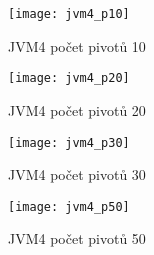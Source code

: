 \begin{figure}[h]
\centering
\texttt{[image: jvm4\_p10]}
\caption{JVM4 počet pivotů 10\label{fig:jvm4p10}}
\end{figure}
\begin{figure}[h]
\centering
\texttt{[image: jvm4\_p20]}
\caption{JVM4 počet pivotů 20\label{fig:jvm4p20}}
\end{figure}

\begin{figure}[h]
\centering
\texttt{[image: jvm4\_p30]}
\caption{JVM4 počet pivotů 30\label{fig:jvm4p30}}
\end{figure}
\begin{figure}[h]
\centering
\texttt{[image: jvm4\_p50]}
\caption{JVM4 počet pivotů 50\label{fig:jvm4p50}}
\end{figure}
